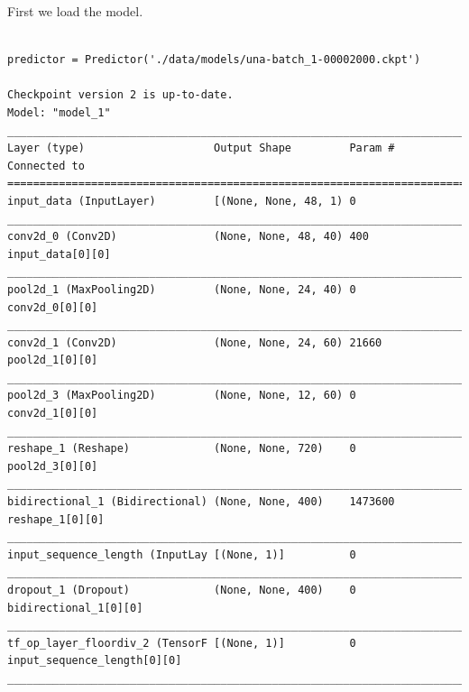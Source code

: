 \documentclass[]{book}
\begin{document}
First we load the model.

\begin{verbatim}

predictor = Predictor('./data/models/una-batch_1-00002000.ckpt')

Checkpoint version 2 is up-to-date.
Model: "model_1"
__________________________________________________________________________________________________
Layer (type)                    Output Shape         Param #     Connected to                     
==================================================================================================
input_data (InputLayer)         [(None, None, 48, 1) 0                                            
__________________________________________________________________________________________________
conv2d_0 (Conv2D)               (None, None, 48, 40) 400         input_data[0][0]                 
__________________________________________________________________________________________________
pool2d_1 (MaxPooling2D)         (None, None, 24, 40) 0           conv2d_0[0][0]                   
__________________________________________________________________________________________________
conv2d_1 (Conv2D)               (None, None, 24, 60) 21660       pool2d_1[0][0]                   
__________________________________________________________________________________________________
pool2d_3 (MaxPooling2D)         (None, None, 12, 60) 0           conv2d_1[0][0]                   
__________________________________________________________________________________________________
reshape_1 (Reshape)             (None, None, 720)    0           pool2d_3[0][0]                   
__________________________________________________________________________________________________
bidirectional_1 (Bidirectional) (None, None, 400)    1473600     reshape_1[0][0]                  
__________________________________________________________________________________________________
input_sequence_length (InputLay [(None, 1)]          0                                            
__________________________________________________________________________________________________
dropout_1 (Dropout)             (None, None, 400)    0           bidirectional_1[0][0]            
__________________________________________________________________________________________________
tf_op_layer_floordiv_2 (TensorF [(None, 1)]          0           input_sequence_length[0][0]      
__________________________________________________________________________________________________

\end{verbatim}
\end{document}
